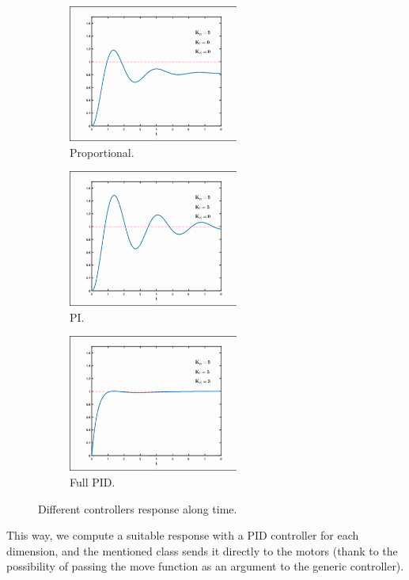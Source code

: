 			
			 \begin{figure}[h]
			 	\centering
			 	\begin{subfigure}[b]{0.3\linewidth}
			 		\centering
			 		\includegraphics[width=2.2in]{images/pid_p}
			 		\caption{Proportional.}
			 		\label{fig:6_pid_p}
			 	\end{subfigure}
			 	\hfill
			 	\begin{subfigure}[b]{0.3\linewidth}
			 		\centering
			 		\includegraphics[width=2.2in]{images/pid_pi}
			 		\caption{PI.}
			 		\label{fig:6_pid_pi}
			 	\end{subfigure}
			 	\hfill
			 	\begin{subfigure}[b]{0.3\linewidth}
			 		\centering
			 		\includegraphics[width=2.2in]{images/pid_pid}
			 		\caption{Full PID.}
			 		\label{fig:6_pid_pid}
			 	\end{subfigure}
			 	\caption{Different controllers response along time.}
			 	\label{fig:6_pids}		 	
			 \end{figure}
		
	This way, we compute a suitable response with a PID controller for each dimension, and the mentioned class sends it directly to the motors (thank to the possibility of passing the move function as an argument to the generic controller).\\
	
